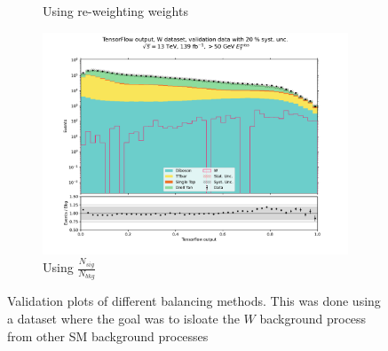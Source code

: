 \documentclass[12pt, a4paper]{book}
\begin{document}
\begin{figure}[!ht]
\begin{subfigure}[b]{0.49\textwidth}
         \caption{Using re-weighting weights}\label{fig:WVALMC}
      \end{subfigure}
      \begin{subfigure}[b]{0.49\textwidth}
         \centering
         \includegraphics[width=1\textwidth]{Balanced/VAL.pdf}
         \caption{Using $\frac{N_{sig}}{N_{bkg}}$}\label{fig:WVALW}
      \end{subfigure}
      \caption[Validation plots for different balancing methods on NN]{Validation plots of different balancing methods. 
      This was done using a dataset where the goal was to isloate the $W$ background process from other SM background processes}\label{fig:WVAL}
\end{figure}
\end{document}
